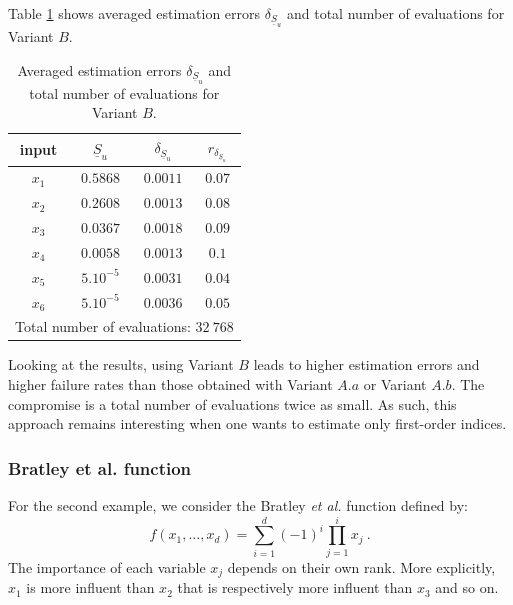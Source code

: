 Table \ref{res.gfunc.B} shows averaged estimation errors $\delta_{\underline{S}_u}$ and total number of evaluations for Variant $B$. 
\begin{table}[!ht]
\caption{Averaged estimation errors $\delta_{\underline{S}_u}$ and total number of evaluations for Variant $B$.}
\centering
\begin{tabular}{cccc}
\hline
 input & $\underline{S}_u$ & $\delta_{\underline{S}_u}$ & $r_{\delta_{\underline{S}_u}}$ \\ \hline
 $x_1$ & $0.5868$ &  $0.0011$ & $0.07$ \\ \hline
 $x_2$ & $0.2608$ &  $0.0013$ & $0.08$ \\ \hline
 $x_3$ & $0.0367$ &  $0.0018$ & $0.09$ \\ \hline
 $x_4$ & $0.0058$ &  $0.0013$ & $0.1$    \\ \hline
 $x_5$ & $5.10^{-5}$ & $0.0031$ & $0.04$  \\ \hline
 $x_6$ & $5.10^{-5}$ & $0.0036$ & $0.05$  \\ \hline \hline
\multicolumn{4}{l}{Total number of evaluations: $32 \ 768$}\\ \hline 
\end{tabular}
\label{res.gfunc.B}
\end{table}
Looking at the results, using Variant $B$ leads to higher estimation errors and higher failure rates than those obtained with Variant $A.a$ or Variant $A.b$. The compromise is a total number of evaluations twice as small. As such, this approach remains interesting when one wants to estimate only first-order indices.

\subsubsection{Bratley et al. function}

For the second example, we consider the Bratley \textit{et al.} function defined by:
$$f(x_1,\dots,x_d)=\sum \limits_{i=1}^{d} (-1)^i \prod \limits_{j=1}^{i} x_j \ .$$
The importance of each variable $x_j$ depends on their own rank. More explicitly, $x_1$ is more influent than $x_2$ that is respectively more influent than $x_3$ and so on. 

